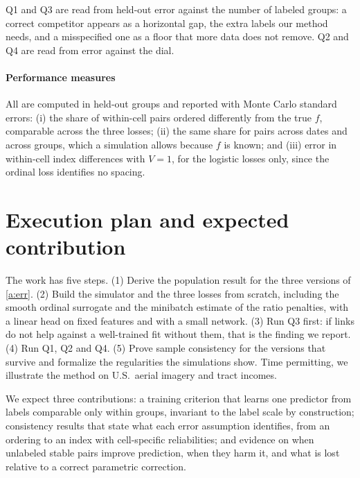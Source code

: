\documentclass[11pt]{article}
\theoremstyle{tight}
\begin{document}
Q1 and Q3 are read from held-out error against the number of labeled groups: a correct
competitor appears as a horizontal gap, the extra labels our method needs, and a misspecified
one as a floor that more data does not remove. Q2 and Q4 are read from error against the dial.

\paragraph{Performance measures}
All are computed in held-out groups and reported with Monte Carlo standard errors: (i) the share
of within-cell pairs ordered differently from the true $f$, comparable across the three losses;
(ii) the same share for pairs across dates and across groups, which a simulation allows because
$f$ is known; and (iii) error in within-cell index differences with $V=1$, for the logistic
losses only, since the ordinal loss identifies no spacing.

\section{Execution plan and expected contribution}

The work has five steps. (1) Derive the population result for the three versions of
\ref{a:err}. (2) Build the simulator and the three losses from scratch, including the smooth
ordinal surrogate and the minibatch estimate of the ratio penalties, with a linear head on fixed
features and with a small network. (3) Run Q3 first: if links do not help against a well-trained
fit without them, that is the finding we report. (4) Run Q1, Q2 and Q4. (5) Prove sample
consistency for the versions that survive and formalize the regularities the simulations show.
Time permitting, we illustrate the method on U.S.\ aerial imagery and tract incomes.

We expect three contributions: a training criterion that learns one predictor from labels
comparable only within groups, invariant to the label scale by construction; consistency results
that state what each error assumption identifies, from an ordering to an index with
cell-specific reliabilities; and evidence on when unlabeled stable pairs improve prediction,
when they harm it, and what is lost relative to a correct parametric correction.
\end{document}
